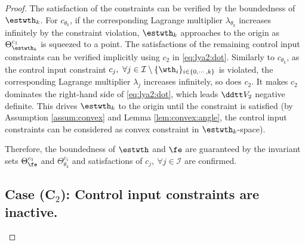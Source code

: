 \documentclass[lettersize,journal]{IEEEtran}
\begin{document}
\begin{proof}
The satisfaction of the constraints can be verified by the boundedness of $\estwth_k$.
For $c_{\theta_k}$, if the corresponding Lagrange multiplier $\lambda_{\theta_k}$ increases infinitely by the constraint violation, $\estwth_k$ approaches to the origin as $\Theta_{\estwth_k}^{c_1}$ is squeezed to a point.
The satisfactions of the remaining control input constraints can be verified implicitly using $c_2$ in \eqref{eq:lya2:dot}.
Similarly to $c_{\theta_k}$, as the control input constraint $c_j,\ \forall j\in\mathcal{I}\setminus \{\wth_i\}_{i\in\{0,\cdots,k\}}$ is violated, the corresponding Lagrange multiplier $\lambda_j$ increases infinitely, so does $c_2$.
It makes $c_2$ dominates the right-hand side of \eqref{eq:lya2:dot}, which leads $\ddtt V_2$ negative definite.
This drives $\estwth_k$ to the origin until the constraint is satisfied (\ie by Assumption \ref{assum:convex} and Lemma \ref{lem:convex:angle}, the control input constraints can be considered as convex constraint in $\estwth_k$-space).

Therefore, the boundedness of $\estwth$ and $\fe$ are guaranteed by the invariant sets $\Theta_{\fe}^{c_1}$ and $\Theta_{\theta_k}^{c_1}$ and satisfactions of $c_j,\ \forall j\in\mathcal{I}$ are confirmed.

\subsection*{Case (C$_2$): Control input constraints are inactive.}


\end{proof}
\end{document}
